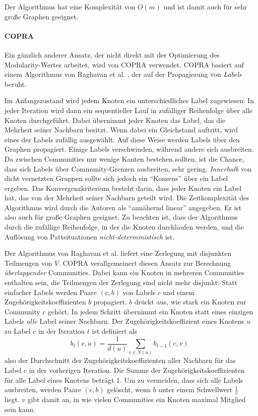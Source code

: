 Der Algorithmus hat eine Komplexität von $O(m)$ und ist damit auch
für sehr große Graphen geeignet.

\paragraph{COPRA}
\label{sec:copra}

Ein gänzlich anderer Ansatz, der nicht direkt mit der Optimierung
des Modularity-Wertes arbeitet, wird von COPRA \cite{Gregory2010}
verwendet. COPRA basiert auf einem Algorithmus von Raghavan et
al. \cite{Raghavan2007}, der auf der Propagierung von \emph{Labels}
beruht. 

Im Anfangszustand wird jedem Knoten ein unterschiedliches Label
zugewiesen. In jeder Iteration wird dann ein sequentieller Lauf in
zufälliger Reihenfolge über alle Knoten durchgeführt. Dabei
übernimmt jeder Knoten das Label, das die Mehrheit seiner Nachbarn
besitzt. Wenn dabei ein Gleichstand auftritt, wird eines der Labels
zufällig ausgewählt. Auf diese Weise werden Labels über den
Graphen propagiert. Einige Labels verschwinden, während andere sich
ausbreiten. Da zwischen Communities nur wenige Kanten bestehen
sollten, ist die Chance, dass sich Labels über Community-Grenzen
ausbreiten, sehr gering. \emph{Innerhalb} von dicht vernetzten Gruppen
sollte sich jedoch ein "`Konsens"' über ein Label ergeben. Das
Konvergenzkriterium besteht darin, dass jeder Knoten ein Label hat,
das von der Mehrheit seiner Nachbarn geteilt wird. Die
Zeitkomplexität des Algorithmus wird durch die Autoren als
"`annähernd linear"' angegeben. Er ist also auch für große
Graphen geeignet. Zu beachten ist, dass der Algorithmus durch die
zufällige Reihenfolge, in der die Knoten durchlaufen werden, und die
Auflösung von Pattsituationen \emph{nicht-deterministisch} ist.

Der Algorithmus von Raghavan et al. liefert eine Zerlegung mit
disjunkten Teilmengen von $V$. COPRA verallgemeinert diesen Ansatz zur
Berechnung \emph{überlappender} Communities. Dabei kann ein Knoten
in mehreren Communities enthalten sein, die Teilmengen der Zerlegung
sind nicht mehr disjunkt. Statt einfacher Labels werden Paare $(c, b)$
von Labels $c$ und einem Zugehörigkeitskoeffizienten $b$
propagiert. $b$ drückt aus, wie stark ein Knoten zur Community $c$
gehört. In jedem Schritt übernimmt ein Knoten statt eines einzigen
Labels \emph{alle} Label seiner Nachbarn. Der
Zugehörigkeitskoeffizient eines Knotens $u$ zu Label $c$ in der
Iteration $t$ ist definiert als
\begin{equation}
  \label{eq:10}
  b_t(c, u) = \frac{1}{d(u)}\sum_{v \in N(u)}b_{t-1}(c, v)
\end{equation}
also der Durchschnitt der Zugehörigkeitskoeffizienten aller
Nachbarn für das Label $c$ in der vorherigen Iteration. Die Summe
der Zugehörigkeitskoeffizienten für alle Label eines Knotens
beträgt 1. Um zu vermeiden, dass sich alle Labels ausbreiten, werden
Paare $(c, b)$ gelöscht, wenn $b$ unter einem Schwellwert
$\frac{1}{v}$ liegt. $v$ gibt damit an, in wie vielen Communities ein
Knoten maximal Mitglied sein kann. 


